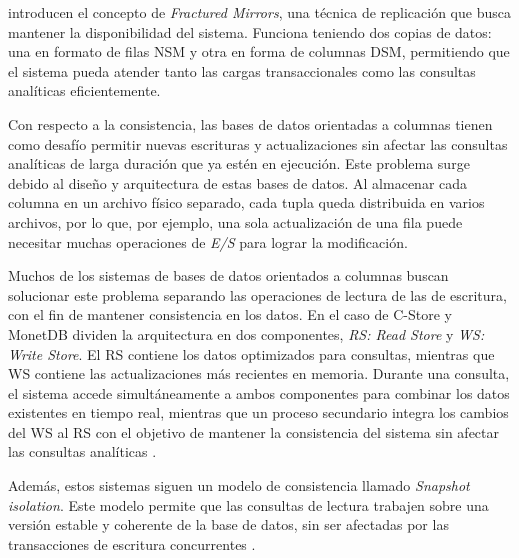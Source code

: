 \textcite{abadi2013} introducen el concepto de \textit{Fractured Mirrors}, una técnica de replicación que busca mantener la disponibilidad del sistema. Funciona teniendo dos copias de datos: una en formato de filas NSM y otra en forma de columnas DSM, permitiendo que el sistema pueda atender tanto las cargas transaccionales como las consultas analíticas eficientemente.

Con respecto a la consistencia, las bases de datos orientadas a columnas tienen como desafío permitir nuevas escrituras y actualizaciones sin afectar las consultas analíticas de larga duración que ya estén en ejecución. Este problema surge debido al diseño y arquitectura de estas bases de datos. Al almacenar cada columna en un archivo físico separado, cada tupla queda distribuida en varios archivos, por lo que, por ejemplo, una sola actualización de una fila puede necesitar muchas operaciones de \textit{E/S} para lograr la modificación. \parencite{abadi2013}

Muchos de los sistemas de bases de datos orientados a columnas buscan solucionar este problema separando las operaciones de lectura de las de escritura, con el fin de mantener consistencia en los datos. En el caso de C-Store y MonetDB dividen la arquitectura en dos componentes, \textit{RS: Read Store} y \textit{WS: Write Store}. El RS contiene los datos optimizados para consultas, mientras que WS contiene las actualizaciones más recientes en memoria. Durante una consulta,  el sistema accede simultáneamente a ambos componentes para combinar los datos existentes en tiempo real, mientras que un proceso secundario integra los cambios del WS al RS con el objetivo de mantener la consistencia del sistema sin afectar las consultas analíticas \parencite{abadi2013, stonebraker2005cstore}.

Además, estos sistemas siguen un modelo de consistencia llamado \textit{Snapshot isolation}. Este modelo permite que las consultas de lectura trabajen sobre una versión estable y coherente de la base de datos, sin ser afectadas por las transacciones de escritura concurrentes \parencite{abadi2013, stonebraker2005cstore}.